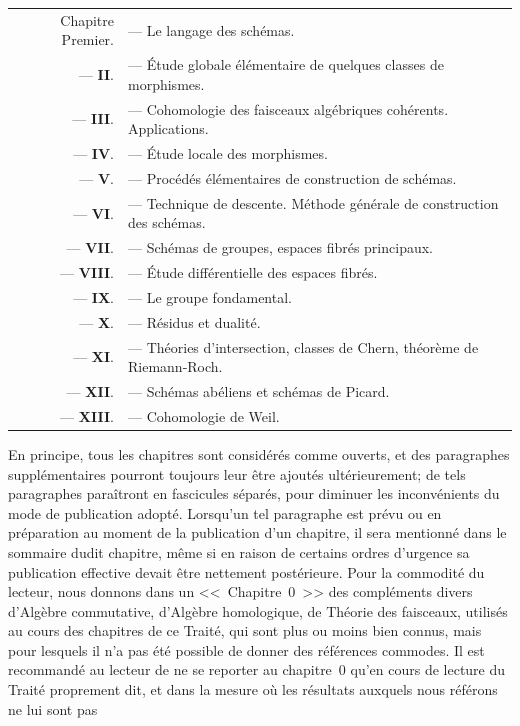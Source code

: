 \medskip
\begin{tabular}{rl}
  Chapitre Premier. & --- Le langage des schémas.\\
  --- \textbf{II}. & --- Étude globale élémentaire de quelques classes de morphismes.\\
  --- \textbf{III}. & --- Cohomologie des faisceaux algébriques cohérents. Applications.\\
  --- \textbf{IV}. & --- Étude locale des morphismes.\\
  --- \textbf{V}. & --- Procédés élémentaires de construction de schémas.\\
  --- \textbf{VI}. & --- Technique de descente. Méthode générale de construction des schémas.\\
  --- \textbf{VII}. & --- Schémas de groupes, espaces fibrés principaux.\\
  --- \textbf{VIII}. & --- Étude différentielle des espaces fibrés.\\
  --- \textbf{IX}. & --- Le groupe fondamental.\\
  --- \textbf{X}. & --- Résidus et dualité.\\
  --- \textbf{XI}. & --- Théories d'intersection, classes de Chern, théorème de Riemann-Roch.\\
  --- \textbf{XII}. & --- Schémas abéliens et schémas de Picard.\\
  --- \textbf{XIII}. & --- Cohomologie de Weil.\\
\end{tabular}
\medskip

En principe, tous les chapitres sont considérés comme ouverts, et des paragraphes supplémentaires pourront toujours leur être ajoutés ultérieurement; de tels paragraphes paraîtront en fascicules séparés, pour diminuer les inconvénients du mode de publication adopté.
Lorsqu'un tel paragraphe est prévu ou en préparation au moment de la publication d'un chapitre, il sera mentionné dans le sommaire dudit chapitre, même si en raison de certains ordres d'urgence sa publication effective devait être nettement postérieure.
Pour la commodité du lecteur, nous donnons dans un <<~Chapitre~0~>> des compléments divers d'Algèbre commutative, d'Algèbre homologique, de Théorie des faisceaux, utilisés au cours des chapitres de ce Traité, qui sont plus ou moins bien connus, mais pour lesquels il n'a pas été possible de donner des références commodes.
Il est recommandé au lecteur de ne se reporter au chapitre~0 qu'en cours de lecture du Traité proprement dit, et dans la mesure où les résultats auxquels nous référons ne lui sont pas

